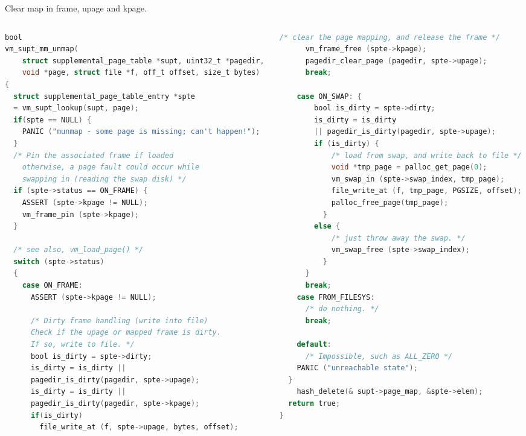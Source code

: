 \documentclass[10pt]{beamer}
\begin{document}
\begin{frame}[fragile]{Clear map in frame, upage and kpage.}
\begin{columns}
\begin{column}{0.5\textwidth}
\begin{lstlisting}[language=C]
bool
vm_supt_mm_unmap(
    struct supplemental_page_table *supt, uint32_t *pagedir,
    void *page, struct file *f, off_t offset, size_t bytes)
{
  struct supplemental_page_table_entry *spte
  = vm_supt_lookup(supt, page);
  if(spte == NULL) {
    PANIC ("munmap - some page is missing; can't happen!");
  }
  /* Pin the associated frame if loaded
    otherwise, a page fault could occur while 
    swapping in (reading the swap disk) */
  if (spte->status == ON_FRAME) {
    ASSERT (spte->kpage != NULL);
    vm_frame_pin (spte->kpage);
  }

  /* see also, vm_load_page() */
  switch (spte->status)
  {
    case ON_FRAME:
      ASSERT (spte->kpage != NULL);

      /* Dirty frame handling (write into file)
      Check if the upage or mapped frame is dirty. 
      If so, write to file. */
      bool is_dirty = spte->dirty;
      is_dirty = is_dirty || 
      pagedir_is_dirty(pagedir, spte->upage);
      is_dirty = is_dirty || 
      pagedir_is_dirty(pagedir, spte->kpage);
      if(is_dirty) 
        file_write_at (f, spte->upage, bytes, offset);
\end{lstlisting}
\end{column}
\begin{column}{0.5\textwidth}
\begin{lstlisting}[language=C]
      /* clear the page mapping, and release the frame */
      vm_frame_free (spte->kpage);
      pagedir_clear_page (pagedir, spte->upage);
      break;

    case ON_SWAP: {
        bool is_dirty = spte->dirty;
        is_dirty = is_dirty 
        || pagedir_is_dirty(pagedir, spte->upage);
        if (is_dirty) {
            /* load from swap, and write back to file */
            void *tmp_page = palloc_get_page(0);
            vm_swap_in (spte->swap_index, tmp_page);
            file_write_at (f, tmp_page, PGSIZE, offset);
            palloc_free_page(tmp_page);
          }
        else {
            /* just throw away the swap. */
            vm_swap_free (spte->swap_index);
          }
      }
      break;
    case FROM_FILESYS:
      /* do nothing. */
      break;

    default:
      /* Impossible, such as ALL_ZERO */
    PANIC ("unreachable state");
  }
    hash_delete(& supt->page_map, &spte->elem);
  return true;
}
\end{lstlisting}
\end{column}
\end{columns}
\end{frame}
\end{document}

